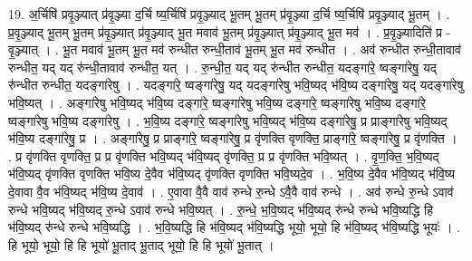 \documentclass[17pt]{extarticle}
\begin{document}
19. अ॒र्चिषि॑ प्रवृ॒ञ्ज्यात् प्र॑वृ॒ञ्ज्या द॒र्चि ष्य॒र्चिषि॑ प्रवृ॒ञ्ज्याद् भू॒तम् भू॒तम् प्र॑वृ॒ञ्ज्या द॒र्चि ष्य॒र्चिषि॑ प्रवृ॒ञ्ज्याद् भू॒तम् । . प्र॒वृ॒ञ्ज्याद् भू॒तम् भू॒तम् प्र॑वृ॒ञ्ज्यात् प्र॑वृ॒ञ्ज्याद् भू॒त मवाव॑ भू॒तम् प्र॑वृ॒ञ्ज्यात् प्र॑वृ॒ञ्ज्याद् भू॒त मव॑ । . प्र॒वृ॒ञ्ज्यादिति॑ प्र - वृ॒ञ्ज्यात् । . भू॒त मवाव॑ भू॒तम् भू॒त मव॑ रुन्धीत रुन्धी॒ताव॑ भू॒तम् भू॒त मव॑ रुन्धीत । . अव॑ रुन्धीत रुन्धी॒तावाव॑ रुन्धीत॒ यद् यद् रु॑न्धी॒तावाव॑ रुन्धीत॒ यत् । . रु॒न्धी॒त॒ यद् यद् रु॑न्धीत रुन्धीत॒ यदङ्गा॑रे॒ ष्वङ्गा॑रेषु॒ यद् रु॑न्धीत रुन्धीत॒ यदङ्गा॑रेषु । . यदङ्गा॑रे॒ ष्वङ्गा॑रेषु॒ यद् यदङ्गा॑रेषु भवि॒ष्यद् भ॑वि॒ष्य दङ्गा॑रेषु॒ यद् यदङ्गा॑रेषु भवि॒ष्यत् । . अङ्गा॑रेषु भवि॒ष्यद् भ॑वि॒ष्य दङ्गा॑रे॒ ष्वङ्गा॑रेषु भवि॒ष्य दङ्गा॑रे॒ ष्वङ्गा॑रेषु भवि॒ष्य दङ्गा॑रे॒ ष्वङ्गा॑रेषु भवि॒ष्य दङ्गा॑रेषु । . भ॒वि॒ष्य दङ्गा॑रे॒ ष्वङ्गा॑रेषु भवि॒ष्यद् भ॑वि॒ष्य दङ्गा॑रेषु॒ प्र प्राङ्गा॑रेषु भवि॒ष्यद् भ॑वि॒ष्य दङ्गा॑रेषु॒ प्र । . अङ्गा॑रेषु॒ प्र प्राङ्गा॑रे॒ ष्वङ्गा॑रेषु॒ प्र वृ॑णक्ति वृणक्ति॒ प्राङ्गा॑रे॒ ष्वङ्गा॑रेषु॒ प्र वृ॑णक्ति । . प्र वृ॑णक्ति वृणक्ति॒ प्र प्र वृ॑णक्ति भवि॒ष्यद् भ॑वि॒ष्यद् वृ॑णक्ति॒ प्र प्र वृ॑णक्ति भवि॒ष्यत् । . वृ॒ण॒क्ति॒ भ॒वि॒ष्यद् भ॑वि॒ष्यद् वृ॑णक्ति वृणक्ति भवि॒ष्य दे॒वैव भ॑वि॒ष्यद् वृ॑णक्ति वृणक्ति भवि॒ष्यदे॒व । . भ॒वि॒ष्य दे॒वैव भ॑वि॒ष्यद् भ॑वि॒ष्य दे॒वावा वै॒व भ॑वि॒ष्यद् भ॑वि॒ष्य दे॒वाव॑ । . ए॒वावा वै॒वै वाव॑ रुन्धे रु॒न्धे ऽवै॒वै वाव॑ रुन्धे । . अव॑ रुन्धे रु॒न्धे ऽवाव॑ रुन्धे भवि॒ष्यद् भ॑वि॒ष्यद् रु॒न्धे ऽवाव॑ रुन्धे भवि॒ष्यत् । . रु॒न्धे॒ भ॒वि॒ष्यद् भ॑वि॒ष्यद् रु॑न्धे रुन्धे भवि॒ष्यद्धि हि भ॑वि॒ष्यद् रु॑न्धे रुन्धे भवि॒ष्यद्धि । . भ॒वि॒ष्यद्धि हि भ॑वि॒ष्यद् भ॑वि॒ष्यद्धि भूयो॒ भूयो॒ हि भ॑वि॒ष्यद् भ॑वि॒ष्यद्धि भूयः॑ । . हि भूयो॒ भूयो॒ हि हि भूयो॑ भू॒ताद् भू॒ताद् भूयो॒ हि हि भूयो॑ भू॒तात् । \newline
\end{document}

